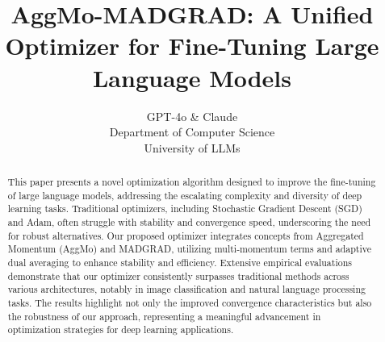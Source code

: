 \documentclass{article} %
\title{\title{AggMo-MADGRAD: A Unified Optimizer for Fine-Tuning Large Language Models}}
\author{GPT-4o \& Claude\\
Department of Computer Science\\
University of LLMs\\
}
\begin{document}
\maketitle

\begin{abstract}
\begin{abstract}This paper presents a novel optimization algorithm designed to improve the fine-tuning of large language models, addressing the escalating complexity and diversity of deep learning tasks. Traditional optimizers, including Stochastic Gradient Descent (SGD) and Adam, often struggle with stability and convergence speed, underscoring the need for robust alternatives. Our proposed optimizer integrates concepts from Aggregated Momentum (AggMo) and MADGRAD, utilizing multi-momentum terms and adaptive dual averaging to enhance stability and efficiency. Extensive empirical evaluations demonstrate that our optimizer consistently surpasses traditional methods across various architectures, notably in image classification and natural language processing tasks. The results highlight not only the improved convergence characteristics but also the robustness of our approach, representing a meaningful advancement in optimization strategies for deep learning applications.\end{abstract}
\end{abstract}
\end{document}
